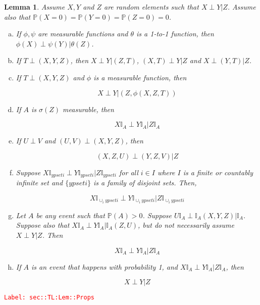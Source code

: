 \documentclass[12pt]{article}
\newcommand{\mb}{\mathbb}
\newcommand{\tr}{\textcolor{red}}
\newcommand{\labe}[1]{\tr{\texttt{Label: #1}}}
\newcommand{\pr}{\mb{P}}							%
\newcommand{\X}{X}								%
\newcommand{\XX}{Y}								%
\newcommand{\XXX}{Z}							%
\newcommand{\typset}{A}							%
\newtheorem{lem}[thms]{Lemma}
\begin{document}
\begin{lem}
Assume \(\X,\XX\) and \(\XXX\) are random elements such that \(\X\perp \XX|\XXX\). Assume also that \(\pr(\X=0) = \pr(\XX=0) = \pr(\XXX=0) = 0\).

\begin{enumerate}[(a)]
\item If \(\phi,\psi\) are measurable functions and \(\theta\) is a 1-to-1 function, then \(\phi(\X)\perp \psi(\XX)|\theta(\XXX)\).

\item If \(T\perp(\X,\XX,\XXX)\), then \(\X\perp \XX|(\XXX,T)\), \((\X,T)\perp \XX|\XXX\) and \(\X\perp (\XX,T)|\XXX\).

\item If \(T\perp (\X,\XX,\XXX)\) and \(\phi\) is a measurable function, then

\[\X\perp \XX|(\XXX,\phi(\X,\XXX,T))\]

\item If \(\typset\) is \(\sigma(\XXX)\) measurable, then 

\[\X\mb{I}_\typset\perp \XX\mb{I}_\typset|\XXX\mb{I}_\typset\]

\item If \(U\perp V\) and \((U,V)\perp(\X,\XX,\XXX)\), then 

\[(\X,\XXX,U)\perp (\XX,\XXX,V)|\XXX\]

\item Suppose \(\X\mb{I}_{	ypset{i}}\perp \XX\mb{I}_{	ypset{i}}|\XXX\mb{I}_{	ypset{i}}\) for all \(i\in I\) where \(I\) is a finite or countably infinite set and \(\{	ypset{i}\}\) is a family of disjoint sets. Then,

\[\X\mb{I}_{\cup_i 	ypset{i}}\perp \XX\mb{I}_{\cup_i 	ypset{i}}|\XXX\mb{I}_{\cup_i 	ypset{i}}\]

\item Let \(\typset\) be any event such that \(\pr(\typset) > 0\). Suppose \(U\mb{I}_\typset\perp \mb{I}_\typset(\X,\XX,\XXX)|\mb{I}_\typset\). Suppose also that \(\X\mb{I}_\typset\perp \XX\mb{I}_\typset|\mb{I}_\typset(\XXX,U)\), but do not necessarily assume \(\X\perp \XX|\XXX\). Then 

\[\X\mb{I}_\typset\perp \XX\mb{I}_\typset|\XXX\mb{I}_\typset\]

\item If \(\typset\) is an event that happens with probability 1, and \(\X\mb{I}_\typset \perp \XX\mb{I}_\typset |\XXX\mb{I}_\typset\), then 

\[\X\perp \XX |\XXX\]
\end{enumerate}
\label{sec::TL:Lem::Props}
\end{lem}
\labe{sec::TL:Lem::Props}
\end{document}
